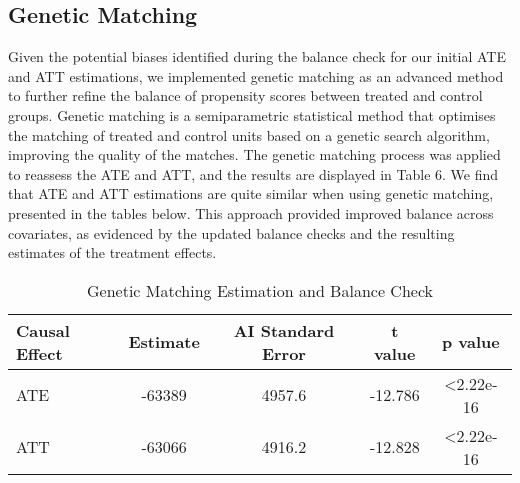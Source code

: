\documentclass{article}[12pt]
\begin{document}
\subsection{Genetic Matching}
Given the potential biases identified during the balance check for our initial ATE and ATT estimations, we implemented genetic matching as an advanced method to further refine the balance of propensity scores between treated and control groups. Genetic matching is a semiparametric statistical method that optimises the matching of treated and control units based on a genetic search algorithm, improving the quality of the matches. The genetic matching process was applied to reassess the ATE and ATT, and the results are displayed in Table 6. We find that ATE and ATT estimations are quite similar when using genetic matching, presented in the tables below. This approach provided improved balance across covariates, as evidenced by the updated balance checks and the resulting estimates of the treatment effects.\par
\begin{table}[htbp]
    \centering
    \caption{Genetic Matching Estimation and Balance Check}
    \label{tab: Genetic Matching Estimation}
    \begin{tabular}{lcccc}
        \toprule
         \textbf{Causal Effect} & \textbf{Estimate} & \textbf{AI Standard Error} & \textbf{t value} & \textbf{p value} \\ 
        \midrule
         ATE & -63389 & 4957.6 & -12.786 & \textless 2.22e-16  \\
         ATT & -63066 & 4916.2 & -12.828 & \textless 2.22e-16 \\
        \bottomrule
    \end{tabular}
\end{table}
\end{document}
